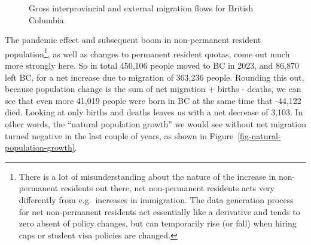 \documentclass[
  letterpaper,
]{article}
\begin{document}
\begin{figure}[H]


\caption{\label{fig-bc-interprovincial-external-migration}Gross
interprovincial and external migration flows for British Columbia}

\end{figure}%

The pandemic effect and subsequent boom in non-permanent resident
population\footnote{There is a lot of misunderstanding about the nature
  of the increase in non-permanent residents out there, net
  non-permanent residents acts very differently from e.g.~increases in
  immigration. The data generation process for net non-permanent
  residents act essentially like a derivative and tends to zero absent
  of policy changes, but can temporarily rise (or fall) when hiring caps
  or student visa policies are changed.}, as well as changes to
permanent resident quotas, come out much more strongly here. So in total
450,106 people moved to BC in 2023, and 86,870 left BC, for a net
increase due to migration of 363,236 people. Rounding this out, because
population change is the sum of net migration + births - deaths, we can
see that even more 41,019 people were born in BC at the same time that
-44,122 died. Looking at only births and deaths leaves us with a net
decrease of 3,103. In other words, the ``natural population growth'' we
would see without net migration turned negative in the last couple of
years, as shown in Figure~\ref{fig-natural-population-growth}.
\end{document}
